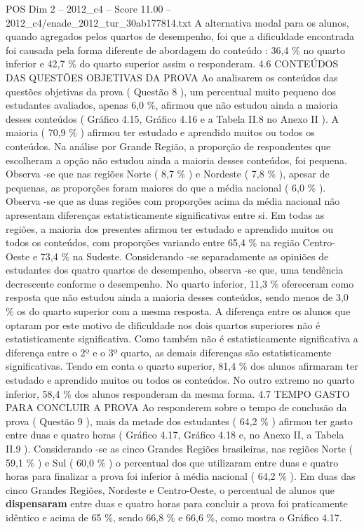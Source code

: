 \begin{textsample}{POS Dim 2 – 2012\_c4 – Score 11.00 – 2012\_c4/enade\_2012\_tur\_30ab177814.txt}
A alternativa modal para os alunos, quando agregados pelos quartos de desempenho, foi que a dificuldade encontrada foi causada pela forma diferente de abordagem do conteúdo : 36,4 \% no quarto inferior e 42,7 \% do quarto superior assim o responderam. 4.6 CONTEÚDOS DAS QUESTÕES OBJETIVAS DA PROVA Ao analisarem os conteúdos das questões objetivas da prova ( Questão 8 ), um percentual muito pequeno dos estudantes avaliados, apenas 6,0 \%, afirmou que não estudou ainda a maioria desses conteúdos ( Gráfico 4.15, Gráfico 4.16 e a Tabela II.8 no Anexo II ).
A maioria ( 70,9 \% ) afirmou ter estudado e aprendido muitos ou todos os conteúdos.
Na análise por Grande Região, a proporção de respondentes que escolheram a opção não estudou ainda a maioria desses conteúdos, foi pequena.
Observa -se que nas regiões Norte ( 8,7 \% ) e Nordeste ( 7,8 \% ), apesar de pequenas, as proporções foram maiores do que a média nacional ( 6,0 \% ).
Observa -se que as duas regiões com proporções acima da média nacional não apresentam diferenças estatisticamente significativas entre si.
Em todas as regiões, a maioria dos presentes afirmou ter estudado e aprendido muitos ou todos os conteúdos, com proporções variando entre 65,4 \% na região Centro-Oeste e 73,4 \% na Sudeste.
Considerando -se separadamente as opiniões de estudantes dos quatro quartos de desempenho, observa -se que, uma tendência decrescente conforme o desempenho.
No quarto inferior, 11,3 \% ofereceram como resposta que não estudou ainda a maioria desses conteúdos, sendo menos de 3,0 \% os do quarto superior com a mesma resposta.
A diferença entre os alunos que optaram por este motivo de dificuldade nos dois quartos superiores não é estatisticamente significativa.
Como também não é estatisticamente significativa a diferença entre o 2º e o 3º quarto, as demais diferenças são estatisticamente significativas.
Tendo em conta o quarto superior, 81,4 \% dos alunos afirmaram ter estudado e aprendido muitos ou todos os conteúdos.
No outro extremo no quarto inferior, 58,4 \% dos alunos responderam da mesma forma. 4.7 TEMPO GASTO PARA CONCLUIR A PROVA Ao responderem sobre o tempo de conclusão da prova ( Questão 9 ), mais da metade dos estudantes ( 64,2 \% ) afirmou ter gasto entre duas e quatro horas ( Gráfico 4.17, Gráfico 4.18 e, no Anexo II, a Tabela II.9 ).
Considerando -se as cinco Grandes Regiões brasileiras, nas regiões Norte ( 59,1 \% ) e Sul ( 60,0 \% ) o percentual dos que utilizaram entre duas e quatro horas para finalizar a prova foi inferior à média nacional ( 64,2 \% ).
Em duas das cinco Grandes Regiões, Nordeste e Centro-Oeste, o percentual de alunos que \textbf{dispensaram} entre duas e quatro horas para concluir a prova foi praticamente idêntico e acima de 65 \%, sendo 66,8 \% e 66,6 \%, como mostra o Gráfico 4.17.

\end{textsample}
